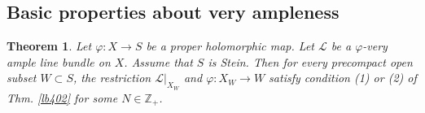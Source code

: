 \documentclass[12pt,b5paper,notitlepage]{report}
\theoremstyle{definition}
\newtheorem{eg}[df]{Example}
\theoremstyle{plain}
\newtheorem{thm}[df]{Theorem}
\newtheorem{pp}[df]{Proposition}
\newcommand{\wtd}{\widetilde}
\newcommand{\id}{\mathbf{1}}
\newcommand{\scr}{\mathscr}
\newcommand{\blt}{\bullet}
\newcommand{\Zbb}{\mathbb Z}
\newcommand{\Pbb}{\mathbb P}
\newcommand{\pr}{\mathrm {pr}}
\numberwithin{equation}{section}
\begin{document}
\begin{comment}
\begin{eg}\label{lb403}
For each $n\in\Zbb_+$, the sheaf $\scr O_{\Pbb^N_S}(n)$ is $\pr_S$-very ample, since the (possibly repeating) sections $(\zeta_i\zeta_j^{n-1})_{0\leq i,j\leq N}$ satisfy the conditions in Thm. \ref{lb402}-(2). This gives a closed embedding $\kappa_n\times\id_S:\Pbb^N_S\rightarrow\Pbb^{2N+1}_S$  such that $\pr_{\Pbb^N_S\rightarrow S}=\pr_{\Pbb^{\wtd N}_S\rightarrow S}\circ(\kappa_n\times\id_S)$ and $(\kappa_n\times\id_S)^*\scr O(1)\simeq\scr O(n)$, where
\begin{gather*}
\kappa_n:\Pbb^N\rightarrow\Pbb^{2N+1}\qquad
[z_0,\dots,z_N]\mapsto [z_i z_j^{n-1}]_{0\leq i,j\leq N}
\end{gather*}
(Note that $\kappa_n$ is clearly an injective immersion of complex manifold, and hence a closed immersion because $\Pbb^N$ is compact.)
\end{eg}


\begin{pp}
Let $\varphi:X\rightarrow S$ be a proper holomorphic map. Let $\scr L$ be a line bundle on $X$. Let $n\in\Zbb_+$. Suppose that $\xi_0,\dots,\xi_N\in\scr L(X)$ satisfy condition (2) of Thm. \ref{lb402}. Then the same is true for $(\xi_i\otimes\xi_j^{\otimes(n-1)})_{0\leq i,j\leq N}$. In particular, $\scr L^{\otimes n}$ is $\varphi$-very ample.
\end{pp}


\begin{proof}
It is clear that $(\xi_i\otimes\xi_j^{\otimes(n-1)})_{0\leq i,j\leq N}$ have no common zeros, and that the map they give from $X$ to $\Pbb^{2N+1}_S$ is the composition of $[\xi_\blt]\vee\varphi:X\rightarrow \Pbb^N_S$ and the map $\kappa_n\times\id_S$ in Exp. \ref{lb403}, both of which are closed embeddings.
\end{proof}

\end{comment}












\subsection{Basic properties about very ampleness}


\begin{thm}\label{lb407}
Let $\varphi:X\rightarrow S$ be a proper holomorphic map. Let $\scr L$ be a $\varphi$-very ample line bundle on $X$. Assume that $S$ is Stein. Then for every precompact open subset $W\subset S$, the restriction $\scr L|_{X_W}$ and $\varphi:X_W\rightarrow W$ satisfy condition (1) or (2) of Thm. \ref{lb402} for some $N\in\Zbb_+$.
\end{thm}
\end{document}
